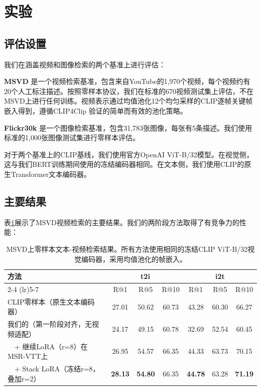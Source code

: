 \documentclass[10pt,a4paper]{ctexart}
\begin{document}
\section{实验}

\subsection{评估设置}

我们在涵盖视频和图像检索的两个基准上进行评估：

\textbf{MSVD} \citep{chen2011collecting}是一个视频检索基准，包含来自YouTube的1,970个视频，每个视频约有20个人工标注描述。按照零样本协议，我们在标准的670视频测试集上评估，不在MSVD上进行任何训练。视频表示通过均值池化12个均匀采样的CLIP逐帧关键帧嵌入得到，遵循CLIP4Clip \citep{luo2022clip4clip}验证的简单而有效的池化策略。

\textbf{Flickr30k} \citep{young2014flickr30k}是一个图像检索基准，包含31,783张图像，每张有5条描述。我们使用标准的1,000张图像测试集进行零样本评估。

对于两个基准上的CLIP基线，我们使用官方OpenAI ViT-B/32模型。在视觉侧，这与我们BERT训练期间使用的冻结编码器相同。在文本侧，我们使用CLIP的原生Transformer文本编码器。

\subsection{主要结果}

表\ref{tab:video_results}展示了MSVD视频检索的主要结果。我们的两阶段方法取得了有竞争力的性能：

\begin{table}[h]
\centering
\caption{MSVD上零样本文本-视频检索结果。所有方法使用相同的冻结CLIP ViT-B/32视觉编码器，采用均值池化的帧嵌入。}
\label{tab:video_results}
\begin{tabular}{lcccccc}
\toprule
方法 & \multicolumn{3}{c}{t2i} & \multicolumn{3}{c}{i2t} \\
\cmidrule(lr){2-4} \cmidrule(lr){5-7}
 & R@1 & R@5 & R@10 & R@1 & R@5 & R@10 \\
\midrule
CLIP零样本（原生文本编码器） & 27.01 & 50.62 & 60.73 & 43.28 & 60.30 & 66.27 \\
我们的（第一阶段对齐，无视频适配） & 24.17 & 49.15 & 60.78 & 32.69 & 52.54 & 60.45 \\
~~+ 继续LoRA（r=8）在MSR-VTT上 & 26.95 & 54.57 & 66.35 & 44.33 & 63.73 & 70.15 \\
~~+ Stack LoRA（冻结r=8，叠加r=2） & \textbf{28.13} & \textbf{54.80} & 66.35 & \textbf{44.78} & 63.28 & \textbf{71.19} \\
\bottomrule
\end{tabular}
\end{table}
\end{document}
